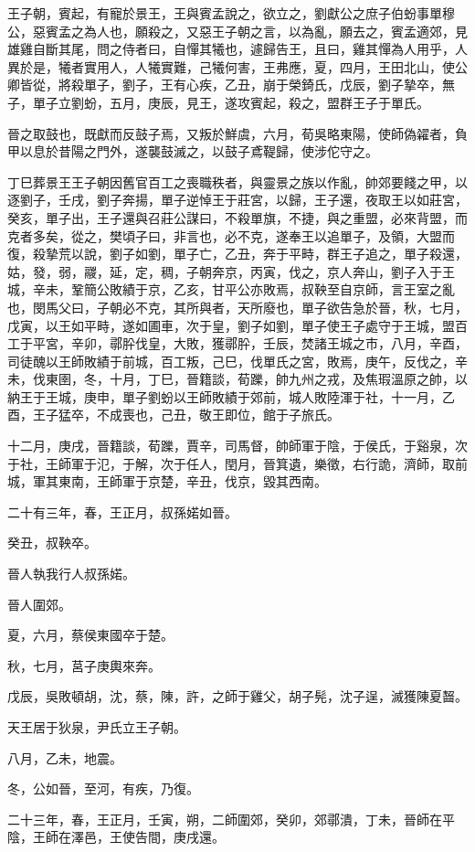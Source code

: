 \begin{pinyinscope}
王子朝，賓起，有寵於景王，王與賓孟說之，欲立之，劉獻公之庶子伯蚡事單穆公，惡賓孟之為人也，願殺之，又惡王子朝之言，以為亂，願去之，賓孟適郊，見雄雞自斷其尾，問之侍者曰，自憚其犧也，遽歸告王，且曰，雞其憚為人用乎，人異於是，犧者實用人，人犧實難，己犧何害，王弗應，夏，四月，王田北山，使公卿皆從，將殺單子，劉子，王有心疾，乙丑，崩于榮錡氏，戊辰，劉子摯卒，無子，單子立劉蚡，五月，庚辰，見王，遂攻賓起，殺之，盟群王子于單氏。

晉之取鼓也，既獻而反鼓子焉，又叛於鮮虞，六月，荀吳略東陽，使師偽糴者，負甲以息於昔陽之門外，遂襲鼓滅之，以鼓子鳶鞮歸，使涉佗守之。

丁巳葬景王王子朝因舊官百工之喪職秩者，與靈景之族以作亂，帥郊要餞之甲，以逐劉子，壬戌，劉子奔揚，單子逆悼王于莊宮，以歸，王子還，夜取王以如莊宮，癸亥，單子出，王子還與召莊公謀曰，不殺單旗，不捷，與之重盟，必來背盟，而克者多矣，從之，樊頃子曰，非言也，必不克，遂奉王以追單子，及領，大盟而復，殺摯荒以說，劉子如劉，單子亡，乙丑，奔于平畤，群王子追之，單子殺還，姑，發，弱，鬷，延，定，稠，子朝奔京，丙寅，伐之，京人奔山，劉子入于王城，辛未，鞏簡公敗績于京，乙亥，甘平公亦敗焉，叔鞅至自京師，言王室之亂也，閔馬父曰，子朝必不克，其所與者，天所廢也，單子欲告急於晉，秋，七月，戊寅，以王如平畤，遂如圃車，次于皇，劉子如劉，單子使王子處守于王城，盟百工于平宮，辛卯，鄩肸伐皇，大敗，獲鄩肸，壬辰，焚諸王城之市，八月，辛酉，司徒醜以王師敗績于前城，百工叛，己巳，伐單氏之宮，敗焉，庚午，反伐之，辛未，伐東圉，冬，十月，丁巳，晉籍談，荀躒，帥九州之戎，及焦瑕溫原之帥，以納王于王城，庚申，單子劉蚡以王師敗績于郊前，城人敗陸渾于社，十一月，乙酉，王子猛卒，不成喪也，己丑，敬王即位，館于子旅氏。

十二月，庚戌，晉籍談，荀躒，賈辛，司馬督，帥師軍于陰，于侯氏，于谿泉，次于社，王師軍于氾，于解，次于任人，閏月，晉箕遺，樂徵，右行詭，濟師，取前城，軍其東南，王師軍于京楚，辛丑，伐京，毀其西南。

二十有三年，春，王正月，叔孫婼如晉。

癸丑，叔鞅卒。

晉人執我行人叔孫婼。

晉人圍郊。

夏，六月，蔡侯東國卒于楚。

秋，七月，莒子庚輿來奔。

戊辰，吳敗頓胡，沈，蔡，陳，許，之師于雞父，胡子髡，沈子逞，滅獲陳夏齧。

天王居于狄泉，尹氏立王子朝。

八月，乙未，地震。

冬，公如晉，至河，有疾，乃復。

二十三年，春，王正月，壬寅，朔，二師圍郊，癸卯，郊鄩潰，丁未，晉師在平陰，王師在澤邑，王使告間，庚戌還。


\end{pinyinscope}
